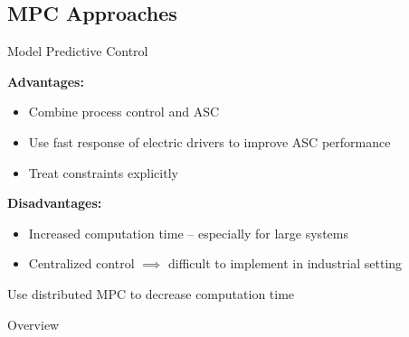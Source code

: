 \subsection{MPC Approaches}
\begin{frame}{Model Predictive Control}

  {\bfseries Advantages:\\}
  \begin{itemize}
    \item Combine process control and ASC
    \item Use fast response of electric drivers to improve ASC performance
    \item Treat constraints explicitly
  \end{itemize}
  \vspace{1em}
  {\bfseries Disadvantages:\\}
  \begin{itemize}
    \item Increased computation time -- especially for large systems
    \item Centralized control $\implies$ difficult to implement in industrial setting
  \end{itemize}
  \vspace{1em}

  \pause

  {\centering
    \alert{Use distributed MPC to decrease computation time}\\
  }

\end{frame}

\printsectiontitlefalse
\begin{frame}{Overview}
  \begin{multicols}{2}
    \tableofcontents[%
  subsectionstyle=shaded/shaded/show,
sectionstyle=shaded/show]
  \end{multicols}
\end{frame}
\printsectiontitletrue


